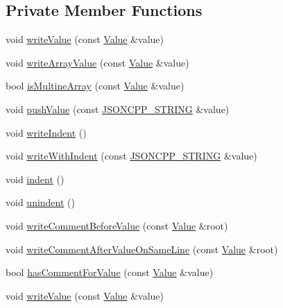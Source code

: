 \subsection*{Private Member Functions}
\begin{DoxyCompactItemize}
\item 
void \hyperlink{class_json_1_1_styled_writer_ac40143cf43f7c4a94d3d0b41e5245069}{write\+Value} (const \hyperlink{class_json_1_1_value}{Value} \&value)
\item 
void \hyperlink{class_json_1_1_styled_writer_a0618c23d62965515def15ece1e677f5d}{write\+Array\+Value} (const \hyperlink{class_json_1_1_value}{Value} \&value)
\item 
bool \hyperlink{class_json_1_1_styled_writer_aa5dc671edf10b9976f1511da2271ab9d}{is\+Multine\+Array} (const \hyperlink{class_json_1_1_value}{Value} \&value)
\item 
void \hyperlink{class_json_1_1_styled_writer_a236a833b4bdaa09915c2cac715970f08}{push\+Value} (const \hyperlink{config_8h_a1e723f95759de062585bc4a8fd3fa4be}{J\+S\+O\+N\+C\+P\+P\+\_\+\+S\+T\+R\+I\+NG} \&value)
\item 
void \hyperlink{class_json_1_1_styled_writer_a885f4bfb5701896d60eee6716d2db7e4}{write\+Indent} ()
\item 
void \hyperlink{class_json_1_1_styled_writer_ac38e02972054125c38efbe327b52f6ac}{write\+With\+Indent} (const \hyperlink{config_8h_a1e723f95759de062585bc4a8fd3fa4be}{J\+S\+O\+N\+C\+P\+P\+\_\+\+S\+T\+R\+I\+NG} \&value)
\item 
void \hyperlink{class_json_1_1_styled_writer_a0b65be6186a7c6638270990265e42b97}{indent} ()
\item 
void \hyperlink{class_json_1_1_styled_writer_acee1c9285519b573cfcb00b7e7f5a809}{unindent} ()
\item 
void \hyperlink{class_json_1_1_styled_writer_ad3452c48fabf968bf3693549331ec06e}{write\+Comment\+Before\+Value} (const \hyperlink{class_json_1_1_value}{Value} \&root)
\item 
void \hyperlink{class_json_1_1_styled_writer_ab12b274c62822fc51ec4617c6be95139}{write\+Comment\+After\+Value\+On\+Same\+Line} (const \hyperlink{class_json_1_1_value}{Value} \&root)
\item 
bool \hyperlink{class_json_1_1_styled_writer_a37a806d010f708cb68556f2666f79bdf}{has\+Comment\+For\+Value} (const \hyperlink{class_json_1_1_value}{Value} \&value)
\item 
void \hyperlink{class_json_1_1_styled_writer_ac40143cf43f7c4a94d3d0b41e5245069}{write\+Value} (const \hyperlink{class_json_1_1_value}{Value} \&value)

\end{DoxyCompactItemize}
